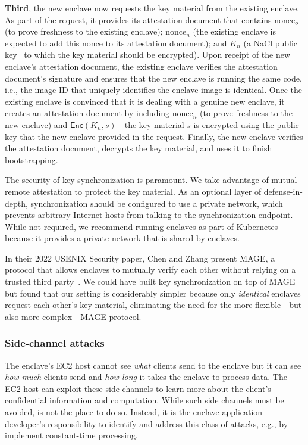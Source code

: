 \textbf{Third}, the new enclave now requests the key material from the existing
enclave.  As part of the request, it provides its attestation document that
contains $\textrm{nonce}_o$ (to prove freshness to the existing enclave);
$\textrm{nonce}_n$ (the existing enclave is expected to add this nonce to its
attestation document); and $K_n$ (a NaCl public key~\cite{nacl} to which the key
material should be encrypted).  Upon receipt of the new enclave's attestation
document, the existing enclave verifies the attestation document's signature and
ensures that the new enclave is running the same code, i.e., the image ID that
uniquely identifies the enclave image is identical.  Once the existing enclave
is convinced that it is dealing with a genuine new enclave, it creates an
attestation document by including $\textrm{nonce}_n$ (to prove freshness to the
new enclave) and $\textsf{Enc}(K_n, s)$---the key material $s$ is encrypted
using the public key that the new enclave provided in the request.  Finally, the
new enclave verifies the attestation document, decrypts the key material, and
uses it to finish bootstrapping.

The security of key synchronization is paramount.  We take advantage of mutual
remote attestation to protect the key material.  As an optional layer of
defense-in-depth, synchronization should be configured to use a private network,
which prevents arbitrary Internet hosts from talking to the synchronization
endpoint.  While not required, we recommend running enclaves as part of
Kubernetes because it provides a private network that is shared by enclaves.

In their 2022 USENIX Security paper, Chen and Zhang present MAGE, a protocol
that allows enclaves to mutually verify each other without relying on a trusted
third party~\cite{Chen2022a}.  We could have built key synchronization on top of
MAGE but found that our setting is considerably simpler because only
\emph{identical} enclaves request each other's key material, eliminating the
need for the more flexible---but also more complex---MAGE protocol.

\subsubsection{Side-channel attacks}%
\label{sec:side-channels}

The enclave's EC2 host cannot see \emph{what} clients send to the enclave but it
can see \emph{how much} clients send and \emph{how long} it takes the enclave to
process data.  The EC2 host can exploit these side channels to learn more about
the client's confidential information and computation.  While such side channels
must be avoided, \tool{} is not the place to do so.  Instead, it is the enclave
application developer's responsibility to identify and address this class of
attacks, e.g., by implement constant-time processing.

